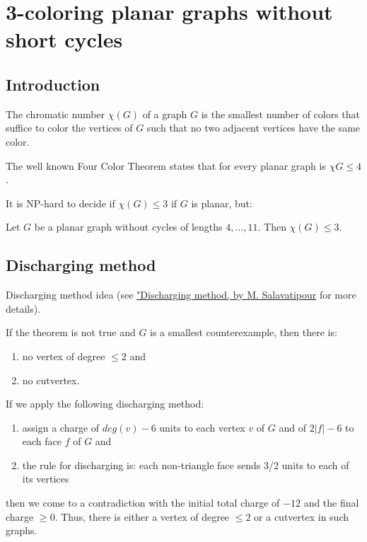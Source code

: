 \chapter{3-coloring planar graphs without short cycles}

\section{Introduction}

The chromatic number $\chi(G)$ of a graph $G$ is the smallest number of colors that suffice to color the vertices of $G$ such that no two adjacent vertices have the same color.

The well known Four Color Theorem states that for every planar graph is $\chi{G} \leq 4$.

It is NP-hard to decide if $\chi(G) \leq 3$ if $G$ is planar, but:
\begin{theorem}
Let $G$ be a planar graph without cycles of lengths $4, \ldots, 11$. Then $\chi(G) \leq 3$.
\end{theorem}

\section{Discharging method}

Discharging method idea (see \href{http://webdocs.cs.ualberta.ca/~mreza/talks/IPM-math06.pdf}{"Discharging method, by M. Salavatipour} for more details).

\medskip
\noindent If the theorem is not true and $G$ is a smallest counterexample, then there is:
\begin{enumerate}
    \item no vertex of degree $\leq 2$ and
    \item no cutvertex.
\end{enumerate}
If we apply the following discharging method:
\begin{enumerate}
    \item assign a charge of $deg(v) - 6$ units to each vertex $v$ of $G$ and of $2 |f| - 6$ to each face $f$ of $G$ and
    \item the rule for discharging is: each non-triangle face sends 3/2 units to each of its vertices
\end{enumerate}
then we come to a contradiction with the initial total charge of $-12$ and the final charge $\geq 0$. Thus, there is either a vertex of degree $\leq 2$ or a cutvertex in such graphs.


